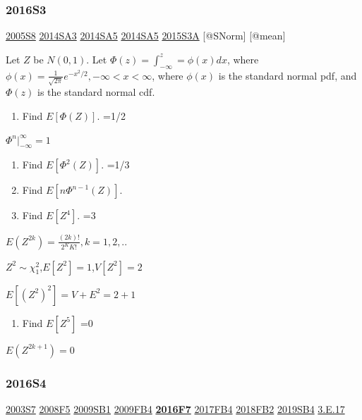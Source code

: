 \documentclass[10pt,twocolumn,portrait]{article}
\providecommand{\tightlist}{%
  \setlength{\itemsep}{0pt}\setlength{\parskip}{0pt}}
\begin{document}
\hypertarget{s3-4}{%
\subsubsection{2016S3}\label{s3-4}}

\protect\hyperlink{s8-1}{2005S8} \protect\hyperlink{sa3-2}{2014SA3}
\protect\hyperlink{sa5-1}{2014SA5} \protect\hyperlink{sa5-1}{2014SA5}
\protect\hyperlink{s3a-1}{2015S3A} {[}@SNorm{]} {[}@mean{]}

Let \(Z\) be \(N(0,1)\). Let \(\Phi(z)=\int_{-\infty}^z=\phi(x)dx\),
where \(\phi(x) = \frac1{\sqrt{2\pi}}e^{-x^2/2},-\infty<x<\infty\),
where \(\phi(x)\) is the standard normal pdf, and \(\Phi(z)\) is the
standard normal cdf.

\begin{enumerate}
\def\labelenumi{(\alph{enumi})}
\tightlist
\item
  Find \(E[\Phi(Z)]\). =1/2
\end{enumerate}

\(\Phi^n |_{-\infty}^{\infty}=1\)

\begin{enumerate}
\def\labelenumi{(\alph{enumi})}
\setcounter{enumi}{1}
\item
  Find \(E[\Phi^{2}(Z)]\). =1/3
\item
  Find \(E[n\Phi^{n-1}(Z)]\).
\item
  Find \(E[Z^4]\). =3
\end{enumerate}

\(E(Z^{2k})=\frac{(2k)!}{2^KK!}, k=1,2,..\)

\(Z^2\sim\chi_1^2\),\(E[Z^2]=1\),\(V[Z^2]=2\)

\(E[(Z^2)^2]=V+E^2=2+1\)

\begin{enumerate}
\def\labelenumi{(\alph{enumi})}
\setcounter{enumi}{4}
\tightlist
\item
  Find \(E[Z^5]\) =0
\end{enumerate}

\(E(Z^{2k+1})=0\)

\hypertarget{s4-4}{%
\subsubsection{2016S4}\label{s4-4}}

\protect\hyperlink{s7}{2003S7} \protect\hyperlink{f5-3}{2008F5}
\protect\hyperlink{sb1}{2009SB1} \protect\hyperlink{fb4}{2009FB4}
\textbf{\protect\hyperlink{f7-5}{2016F7}}
\protect\hyperlink{fb4-3}{2017FB4} \protect\hyperlink{fb2-4}{2018FB2}
\protect\hyperlink{sb4-2}{2019SB4} \protect\hyperlink{e.17}{3.E.17}
\end{document}
